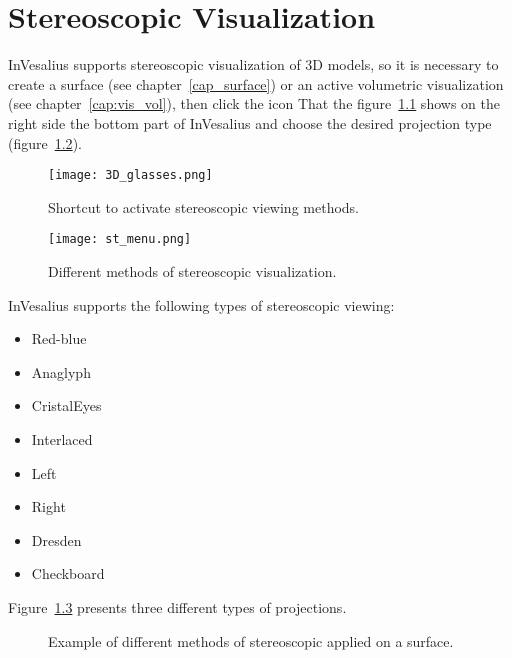 \chapter{Stereoscopic Visualization}

InVesalius supports stereoscopic visualization of 3D models, so it is necessary to create a surface (see chapter~\ref{cap_surface}) or an active volumetric visualization (see chapter~\ref{cap:vis_vol}), then click the icon That the figure~\ref{fig:ster} shows on the right side the bottom part of InVesalius and choose the desired projection type (figure~\ref{fig:st_menu}).


\begin{figure}[!htb]
\centering
\texttt{[image: 3D\_glasses.png]}
\caption{Shortcut to activate stereoscopic viewing methods.}
\label{fig:ster}
\end{figure}

\begin{figure}[!htb]
\centering
\texttt{[image: st\_menu.png]}
\caption{Different methods of stereoscopic visualization.}
\label{fig:st_menu}
\end{figure}

InVesalius supports the following types of stereoscopic viewing:

\begin{itemize}
	\item Red-blue
	\item Anaglyph
	\item CristalEyes
	\item Interlaced
	\item Left
	\item Right
	\item Dresden
	\item Checkboard
\end{itemize}

Figure~\ref{fig:st_surf_methods} presents three different types of projections.


\begin{figure}[!htb]
  \centering
   \qquad
   \qquad
  \hfill
  \caption{Example of different methods of stereoscopic applied on a surface.}
  \label{fig:st_surf_methods}
\end{figure}